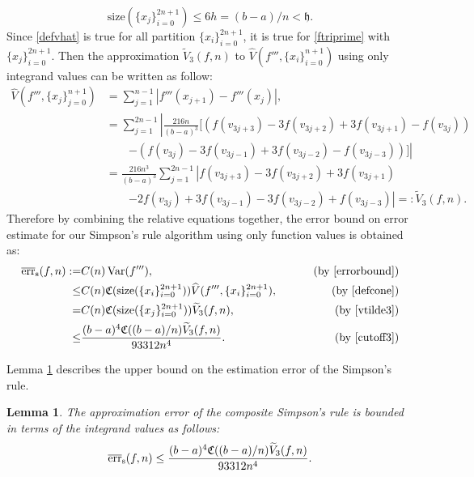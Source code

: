 \documentclass{iitthesis}
\DeclareMathOperator{\Var}{Var}
\newtheorem{lem}{Lemma}
\theoremstyle{definition}
\theoremstyle{remark}
\begin{document}
\begin{equation}\label{cutoff3}
    \text{size}(\{x_j\}_{i=0}^{2n+1})\leq 6h=(b-a)/n<\mathfrak{h}.
\end{equation}
Since \eqref{defvhat} is true for all partition $\{x_i\}_{i=0}^{2n+1}$, it is true for \eqref{ftriprime} with $\{x_j\}_{i=0}^{2n+1}$. Then the approximation $\widetilde{V}_3(f,n)$ to $\widehat{V}(f''',\{x_i\}_{i=0}^{n+1})$ using only integrand values can be written as follow:
\begin{align}\label{vtilde3}
    \nonumber    \widehat{V}(f''',\{x_j\}_{j=0}^{n+1})&=\sum_{j=1}^{n-1}\left|f'''(x_{j+1})-f'''(x_{j})\right|,\\
    \nonumber    &=\sum_{j=1}^{2n-1}\left|\frac{216n}{(b-a)^3}[(f(v_{3j+3})-3f(v_{3j+2})+3f(v_{3j+1})-f(v_{3j}))\right.\\
    \nonumber    &\qquad\left.-(f(v_{3j})-3f(v_{3j-1})+3f(v_{3j-2})-f(v_{3j-3}))]\right|\\
    \nonumber    &=\frac{216n^3}{(b-a)^3}\sum_{j=1}^{2n-1}\left|f(v_{3j+3})-3f(v_{3j+2})+3f(v_{3j+1})\right.\\
                 &\qquad\left.-2f(v_{3j})+3f(v_{3j-1})-3f(v_{3j-2})+f(v_{3j-3})\right|=:\widetilde{V}_3(f,n).
\end{align}
Therefore by combining the relative equations together, the error bound on error estimate for our Simpson's rule algorithm using only function values is obtained as:
\begin{align*}
\overline{\text{err}}_{\text{s}}(f,n):=&C(n)\Var(f'''),\qquad &\text{ (by \eqref{errorbound})}\\
\leq & C(n)\mathfrak{C}(\text{size}(\{x_i\}_{i=0}^{2n+1}))\widehat{V}(f''',\{x_i\}_{i=0}^{2n+1}), \qquad &\text{ (by \eqref{defcone})}\\
=& C(n)\mathfrak{C}(\text{size}(\{x_j\}_{i=0}^{2n+1}))\widetilde{V}_3(f,n), \qquad &\text{ (by \eqref{vtilde3})}\\
  \leq & \frac{(b-a)^4\mathfrak{C}((b-a)/n)\widetilde{V}_3(f,n)}{93312n^4}.\qquad &\text{ (by \eqref{cutoff3})}
\end{align*}

Lemma \ref{lemmaerrorboundsim} describes the upper bound on the estimation error of the Simpson's rule.
\begin{lem}\label{lemmaerrorboundsim}
    The approximation error of the composite Simpson's rule is bounded in terms of the integrand values as follows:
    \begin{equation}\label{errorsimcone}
      \overline{\textup{err}}_{\text{s}}(f,n)\leq \frac{(b-a)^4\mathfrak{C}((b-a)/n)\widetilde{V}_3(f,n)}{93312n^4}.
    \end{equation}
\end{lem}
\end{document}
